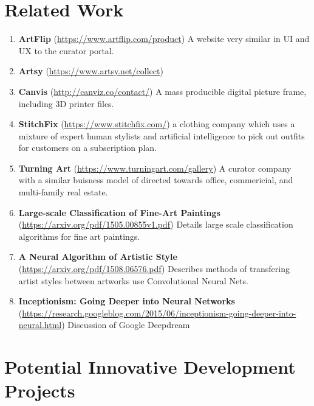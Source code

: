 \documentclass[fontsize=12pt]{scrartcl} %
\numberwithin{equation}{section} %
\numberwithin{figure}{section} %
\numberwithin{table}{section} %
\begin{document}
\section{Related Work}
\begin{enumerate}
    \item\textbf{ArtFlip} (\url{https://www.artflip.com/product}) A website very similar in UI and UX to the curator portal.
    \item\textbf{Artsy}  (\url{https://www.artsy.net/collect})
    \item\textbf{Canvis} (\url{http://canviz.co/contact/})  A mass producible digital picture frame, including 3D printer files.
    \item\textbf{StitchFix} (\url{https://www.stitchfix.com/})  a clothing company which uses a mixture of expert human stylists and artificial intelligence to pick out outfits for customers on a subscription plan.
    \item\textbf{Turning Art} (\url{https://www.turningart.com/gallery}) A curator company with a similar buisness model of directed towards office, commericial, and multi-family real estate.
    \item\textbf{Large-scale Classification of Fine-Art Paintings} (\url{https://arxiv.org/pdf/1505.00855v1.pdf}) Details large scale classification algorithms for fine art paintings.
    \item\textbf{A Neural Algorithm of Artistic Style} (\url{https://arxiv.org/pdf/1508.06576.pdf}) Describes methods of transfering artist styles between artworks use Convolutional Neural Nets.
    \item\textbf{Inceptionism: Going Deeper into Neural Networks} (\url{https://research.googleblog.com/2015/06/inceptionism-going-deeper-into-neural.html}) Discussion of Google Deepdream 
\end{enumerate}

\section{Potential Innovative Development Projects}
\end{document}
